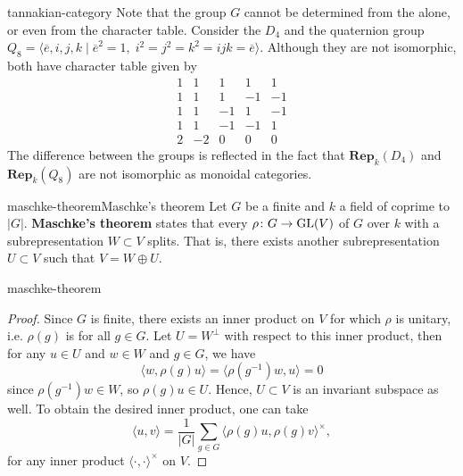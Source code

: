 \begin{example}{tannakian-category}
    Note that the group $G$ cannot be determined from the  alone, or even from the character table. Consider the  $D_4$ and the quaternion group $Q_8 = \langle \overline{e}, i, j, k \mid \overline{e}^2 = 1, \; i^2 = j^2 = k^2 = ijk = \overline{e} \rangle$. Although they are not isomorphic, both have character table given by
    \[ \begin{array}{c|c|c|c|c}
        1 & 1 & 1 & 1 & 1 \\ \hline
        1 & 1 & 1 & -1 & -1 \\ \hline
        1 & 1 & -1 & 1 & -1 \\ \hline
        1 & 1 & -1 & -1 & 1 \\ \hline
        2 & -2 & 0 & 0 & 0
    \end{array} \]
    The difference between the groups is reflected in the fact that $\textbf{Rep}_k(D_4)$ and $\textbf{Rep}_k(Q_8)$ are not isomorphic as monoidal categories.
\end{example}

\begin{topic}{maschke-theorem}{Maschke's theorem}
    Let $G$ be a finite  and $k$ a field of  coprime to $|G|$. \textbf{Maschke's theorem} states that every  $\rho \colon G \to \textup{GL}(V)$ of $G$ over $k$ with a subrepresentation $W \subset V$ splits. That is, there exists another subrepresentation $U \subset V$ such that $V = W \oplus U$.
\end{topic}

\begin{example}{maschke-theorem}
    \begin{proof}
        Since $G$ is finite, there exists an inner product on $V$ for which $\rho$ is unitary, i.e. $\rho(g)$ is  for all $g \in G$. Let $U = W^\perp$ with respect to this inner product, then for any $u \in U$ and $w \in W$ and $g \in G$, we have
        \[ \langle w, \rho(g) u \rangle = \langle \rho(g^{-1}) w, u \rangle = 0 \]
        since $\rho(g^{-1}) w \in W$, so $\rho(g) u \in U$. Hence, $U \subset V$ is an invariant subspace as well. To obtain the desired inner product, one can take
        \[ \langle u, v \rangle = \frac{1}{|G|} \sum_{g \in G} \langle \rho(g) u, \rho(g) v \rangle^\times , \]
        for any inner product $\langle \cdot, \cdot \rangle^\times$ on $V$.
    \end{proof}
\end{example}

